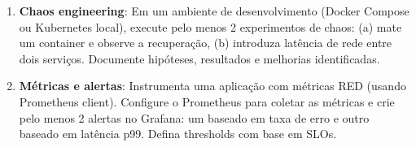 \begin{enumerate}
    \item \textbf{Chaos engineering}: Em um ambiente de desenvolvimento (Docker
    Compose ou Kubernetes local), execute pelo menos 2 experimentos de chaos:
    (a) mate um container e observe a recuperação, (b) introduza latência de rede
    entre dois serviços. Documente hipóteses, resultados e melhorias identificadas.

    \item \textbf{Métricas e alertas}: Instrumenta uma aplicação com métricas
    RED (usando Prometheus client). Configure o Prometheus para coletar as
    métricas e crie pelo menos 2 alertas no Grafana: um baseado em taxa de
    erro e outro baseado em latência p99. Defina thresholds com base em SLOs.
\end{enumerate}
